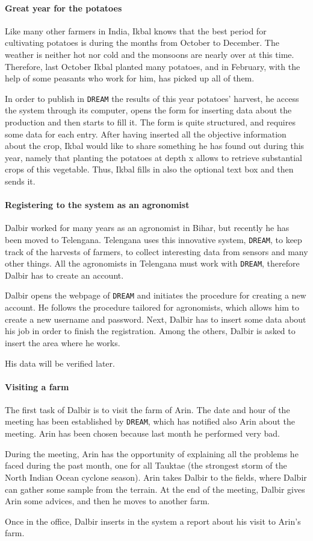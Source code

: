 \documentclass{article}
\begin{document}
\paragraph{Great year for the potatoes}
Like many other farmers in India, Ikbal knows that the best period for cultivating potatoes is during the months from October to December. The weather is neither hot nor cold and the monsoons are nearly over at this time. Therefore, last October Ikbal planted many potatoes, and in February, with the help of some peasants who work for him, has picked up all of them. \par
\noindent In order to publish in \verb|DREAM| the results of this year potatoes' harvest, he access the system through its computer, opens the form for inserting data about the production and then starts to fill it. The form is quite structured, and requires some data for each entry. After having inserted all the objective information about the crop, Ikbal would like to share something he has found out during this year, namely that planting the potatoes at depth x allows to retrieve substantial crops of this vegetable. Thus, Ikbal fills in also the optional text box and then sends it.
\paragraph{Registering to the system as an agronomist}
Dalbir worked for many years as an agronomist in Bihar, but recently he has been moved to Telengana. Telengana uses this innovative system, \verb|DREAM|, to keep track of the harvests of farmers, to collect interesting data from sensors and many other things. All the agronomists in Telengana must work with \verb|DREAM|, therefore Dalbir has to create an account. \par
\noindent Dalbir opens the webpage of \verb|DREAM| and initiates the procedure for creating a new account. He follows the procedure tailored for agronomists, which allows him to create a new username and password. Next, Dalbir has to insert some data about his job in order to finish the registration. Among the others, Dalbir is asked to insert the area where he works.\par
\noindent His data will be verified later.
\paragraph{Visiting a farm}
The first task of Dalbir is to visit the farm of Arin. The date and hour of the meeting has been established by \verb |DREAM|, which has notified also Arin about the meeting. Arin has been chosen because last month he performed very bad.\par
\noindent During the meeting, Arin has the opportunity of explaining all the problems he faced during the past month, one for all Tauktae (the strongest storm of the North Indian Ocean cyclone season). Arin takes Dalbir to the fields, where Dalbir can gather some sample from the terrain. At the end of the meeting, Dalbir gives Arin some advices, and then he moves to another farm. \par
\noindent Once in the office, Dalbir inserts in the system a report about his visit to Arin's farm.
\end{document}

